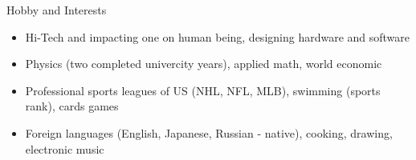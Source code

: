 \documentclass{resume}
\begin{document}
\begin{rSection}{Hobby and Interests}

\begin{itemize}
\item Hi-Tech and impacting one on human being, designing hardware and software
\item Physics (two completed univercity years), applied math, world economic
\item Professional sports leagues of US (NHL, NFL, MLB), swimming (sports rank), cards games
\item Foreign languages (English, Japanese, Russian - native), cooking, drawing, electronic music
\end{itemize}

\end{rSection}

\end{document}
